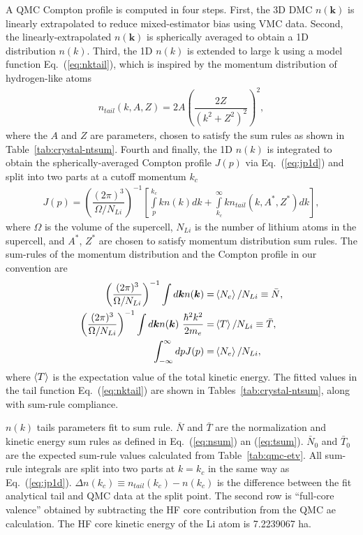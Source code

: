 \documentclass[aps,prl,superscriptaddress]{revtex4-1}
\newcommand{\bs}{\boldsymbol}
\begin{document}
A QMC Compton profile is computed in four steps. First, the 3D DMC $n(\bs{k})$ is linearly extrapolated to reduce mixed-estimator bias using VMC data. Second, the linearly-extrapolated $n(\bs{k})$ is spherically averaged to obtain a 1D distribution $n(k)$. Third, the 1D $n(k)$ is extended to large k using a model function Eq.~(\ref{eq:nktail}), which is inspired by the momentum distribution of hydrogen-like atoms
\begin{align} \label{eq:nktail}
n_{tail}(k, A, Z) = 2A\left(\dfrac{2Z}{(k^2+Z^2)^2}\right)^2,
\end{align}
where the $A$ and $Z$ are parameters, chosen to satisfy the sum rules as shown in Table~\ref{tab:crystal-ntsum}. Fourth and finally, the 1D $n(k)$ is integrated to obtain the spherically-averaged Compton profile $J(p)$ via Eq.~(\ref{eq:jp1d}) and split into two parts at a cutoff momentum $k_c$
\begin{align} \label{eq:jp1d}
J(p) = \left( \dfrac{(2\pi)^3}{\Omega/N_{Li}} \right)^{-1} \left[
\int\limits_p^{k_c} k n(k) dk + \int\limits_{k_c}^{\infty} k n_{tail}(k, A^*, Z^*) dk
\right],
\end{align}
where $\Omega$ is the volume of the supercell, $N_{Li}$ is the number of lithium atoms in the supercell, and $A^*$, $Z^*$ are chosen to satisfy momentum distribution sum rules. %
The sum-rules of the momentum distribution and the Compton profile in our convention are
\begin{align}
\left( \dfrac{(2\pi)^3}{\Omega/N_{Li}} \right)^{-1} \int d\bs{k} n(\bs{k}) =& \braket{N_e}/N_{Li}\equiv \bar{N}, \label{eq:nsum} \\
\left( \dfrac{(2\pi)^3}{\Omega/N_{Li}} \right)^{-1} \int d\bs{k} n(\bs{k})~\frac{\hbar^2k^2}{2m_e} =& \braket{T}/N_{Li} \equiv \bar{T}, \label{eq:tsum} \\
\int_{-\infty}^{\infty} dp J(p) =& \braket{N_e}/N_{Li}, \label{eq:jpsum}
\end{align}
where $\braket{T}$ is the expectation value of the total kinetic energy.
The fitted values in the tail function Eq.~(\ref{eq:nktail}) are shown in Tables~\ref{tab:crystal-ntsum}, along with sum-rule compliance.

\begin{table}[h]
\caption{$n(k)$ tails parameters fit to sum rule. $\bar{N}$ and $\bar{T}$ are the normalization and kinetic energy sum rules as defined in Eq.~(\ref{eq:nsum}) an (\ref{eq:tsum}). $\bar{N}_0$ and $\bar{T}_0$ are the expected sum-rule values calculated from Table~\ref{tab:qmc-etv}. All sum-rule integrals are split into two parts at $k=k_c$ in the same way as Eq.~(\ref{eq:jp1d}). $\Delta n(k_c)\equiv n_{tail}(k_c)-n(k_c)$ is the difference between the fit analytical tail and QMC data at the split point. The second row is ``full-core valence'' obtained by subtracting the HF core contribution from the QMC ae calculation. The HF core kinetic energy of the Li atom is 7.2239067 ha.}

\label{tab:crystal-ntsum}
\end{table}
\end{document}
